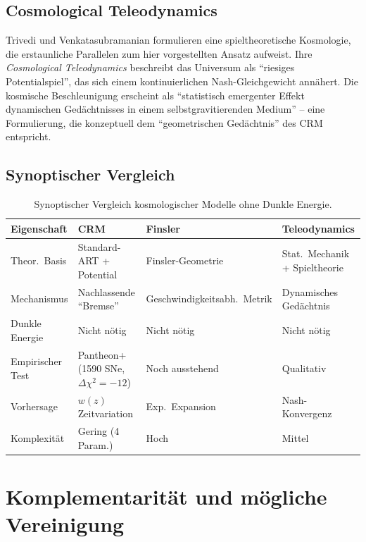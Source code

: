 \documentclass[aps,prd,twocolumn,superscriptaddress,nofootinbib]{revtex4-2}
\begin{document}
\subsection{Cosmological Teleodynamics}

Trivedi und Venkatasubramanian \cite{Trivedi2025} formulieren eine spieltheoretische Kosmologie, die erstaunliche Parallelen zum hier vorgestellten Ansatz aufweist. Ihre \textit{Cosmological Teleodynamics} beschreibt das Universum als ``riesiges Potentialspiel'', das sich einem kontinuierlichen Nash-Gleichgewicht ann\"ahert. Die kosmische Beschleunigung erscheint als ``statistisch emergenter Effekt dynamischen Ged\"achtnisses in einem selbstgravitierenden Medium'' -- eine Formulierung, die konzeptuell dem ``geometrischen Ged\"achtnis'' des CRM entspricht.

\subsection{Synoptischer Vergleich}
\label{subsec:synopse}

\begin{table}[tbp]
\centering
\caption{Synoptischer Vergleich kosmologischer Modelle ohne Dunkle Energie.}
\label{tab:synopse}
\begin{tabular}{llll}
\toprule
\textbf{Eigenschaft} & \textbf{CRM} & \textbf{Finsler} & \textbf{Teleodynamics} \\
\midrule
Theor.\ Basis & Standard-ART + Potential & Finsler-Geometrie & Stat.\ Mechanik + Spieltheorie \\
Mechanismus & Nachlassende ``Bremse'' & Geschwindigkeitsabh.\ Metrik & Dynamisches Ged\"achtnis \\
Dunkle Energie & Nicht n\"otig & Nicht n\"otig & Nicht n\"otig \\
Empirischer Test & Pantheon+ (1590 SNe, $\Delta\chi^2{=}{-}12$) & Noch ausstehend & Qualitativ \\
Vorhersage & $w(z)$ Zeitvariation & Exp.\ Expansion & Nash-Konvergenz \\
Komplexit\"at & Gering (4 Param.) & Hoch & Mittel \\
\bottomrule
\end{tabular}
\end{table}

\section{Komplementarit\"at und m\"ogliche Vereinigung}
\label{sec:komplementaritaet}
\end{document}
